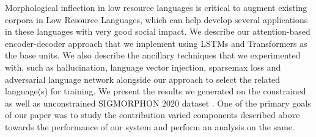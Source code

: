 Morphological inflection in low resource languages is critical to augment existing corpora in Low Resource Languages, which can help develop several applications in these languages with very good social impact. We describe our attention-based encoder-decoder approach that we implement using LSTMs and Transformers as the base units. We also describe the ancillary techniques that we experimented with, such as hallucination, language vector injection, sparsemax loss and adversarial language network alongside our approach to select the related language(s) for training. We present the results we generated on the constrained as well as unconstrained SIGMORPHON 2020 dataset \cite{vylomova2020sigmorphon}. One of the primary goals of our paper was to study the contribution varied components described above towards the performance of our system and perform an analysis on the same.
